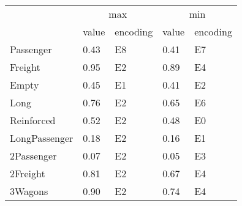 \begin{tabular}{lllll}
\toprule
 & \multicolumn{2}{c}{max} & \multicolumn{2}{c}{min} \\
 & value & encoding & value & encoding \\
\midrule
Passenger & 0.43 & E8 & 0.41 & E7 \\
Freight & 0.95 & E2 & 0.89 & E4 \\
Empty & 0.45 & E1 & 0.41 & E2 \\
Long & 0.76 & E2 & 0.65 & E6 \\
Reinforced & 0.52 & E2 & 0.48 & E0 \\
LongPassenger & 0.18 & E2 & 0.16 & E1 \\
2Passenger & 0.07 & E2 & 0.05 & E3 \\
2Freight & 0.81 & E2 & 0.67 & E4 \\
3Wagons & 0.90 & E2 & 0.74 & E4 \\
\bottomrule
\end{tabular}
